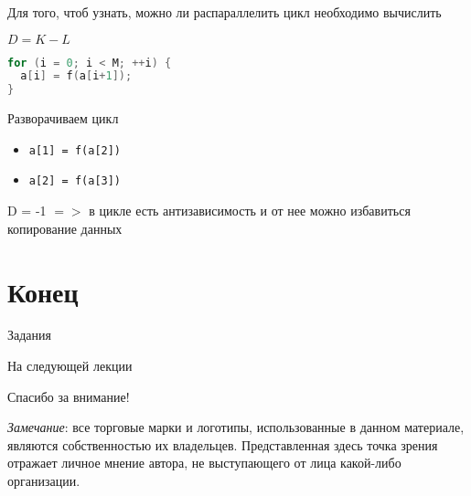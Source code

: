 \begin{frame}[fragile]

Для того, чтоб узнать, можно ли распараллелить цикл необходимо вычислить

$D = K - L$

\begin{lstlisting}[language=C,basicstyle=\ttfamily,keywordstyle=\color{blue},basicstyle=\scriptsize]
for (i = 0; i < M; ++i) {
  a[i] = f(a[i+1]);
}
\end{lstlisting}

Разворачиваем цикл

\begin{itemize}
  \item \texttt{a[1] = f(a[2])}
  \item \texttt{a[2] = f(a[3])}
\end{itemize}

D = -1 $=>$ в цикле есть антизависимость и от нее можно избавиться копирование данных

\end{frame}

\section{Конец}

\begin{frame}{Задания}
\end{frame}

\begin{frame}{На следующей лекции}
\end{frame}

\begin{frame}

{\huge{Спасибо за внимание!}\par}

\vfill

\tiny{\textit{Замечание}: все торговые марки и логотипы, использованные в данном материале, являются собственностью их владельцев. Представленная здесь точка зрения отражает личное мнение автора, не выступающего от лица какой-либо организации.}

\end{frame}


